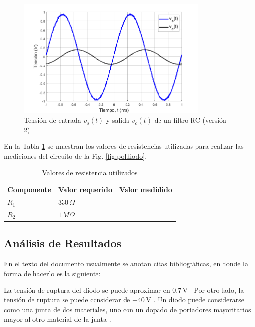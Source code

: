 \documentclass[journal]{IEEEtran}
\begin{document}
\begin{figure}[!ht] 
\centering
\includegraphics[width=3.7in]{plot4}
\caption{Tensión de entrada $v_s(t)$ y salida $v_c(t)$ de un filtro RC (versión 2)}
\label{fig:plot4}
\end{figure}

En la Tabla \ref{tabla1} se muestran los valores de resistencias utilizadas para realizar las mediciones del circuito de la Fig. \ref{fig:poldiodo}.

\begin{table}[!ht]
        \centering
        \caption{Valores de resistencia utilizados}
        \begin{tabular}{|>{\centering\arraybackslash}m{2cm}|>{\centering\arraybackslash}m{2cm}|>{\centering\arraybackslash}m{2cm}|}
             \hline
             Componente & Valor requerido & Valor medidido \\ 
             \hline
             $R_1$ & $330\,\Omega$& \\ 
             \hline
             $R_2$ & $1\,M\Omega$ & \\
             \hline
            \end{tabular}
    	\label{tabla1}   
	\end{table}


\vspace{5mm}

\subsection{Análisis de Resultados}
En el texto del documento usualmente se anotan citas bibliográficas, en donde la forma de hacerlo es la siguiente:


La tensión de ruptura del diodo se puede aproximar en $0.7\,$V \cite{Malik1996,Boylestad,Horowitz1989,Gray1995}. Por otro lado, la tensión de ruptura se puede considerar de $-40\,$V \cite{Floyd2008,Behzad2013,Schilling1994}. Un diodo puede considerarse como una junta de dos materiales, uno con un dopado de portadores mayoritarios mayor al otro material de la junta \cite{Pierret1994}.\\
\end{document}
